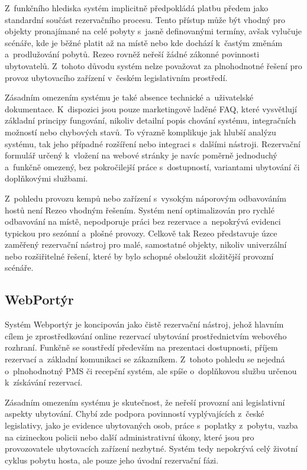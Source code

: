 Z~funkčního hlediska systém implicitně předpokládá platbu předem jako standardní součást rezervačního procesu.
Tento přístup může být vhodný pro objekty pronajímané na celé pobyty s~jasně definovanými termíny, avšak vylučuje scénáře, kde je běžné platit až na místě nebo kde dochází k~častým změnám a~prodlužování pobytů.
Rezeo rovněž neřeší žádné zákonné povinnosti ubytovatelů.
Z~tohoto důvodu systém nelze považovat za plnohodnotné řešení pro provoz ubytovacího zařízení v~českém legislativním prostředí.

Zásadním omezením systému je také absence technické a~uživatelské dokumentace.
K~dispozici jsou pouze marketingově laděné FAQ, které vysvětlují základní principy fungování, nikoliv detailní popis chování systému, integračních možností nebo chybových stavů.
To výrazně komplikuje jak hlubší analýzu systému, tak jeho případné rozšíření nebo integraci s~dalšími nástroji.
Rezervační formulář určený k~vložení na webové stránky je navíc poměrně jednoduchý a~funkčně omezený, bez pokročilejší práce s~dostupností, variantami ubytování či doplňkovými službami.

Z~pohledu provozu kempů nebo zařízení s~vysokým náporovým odbavováním hostů není Rezeo vhodným řešením.
Systém není optimalizován pro rychlé odbavování na místě, nepodporuje práci bez rezervace a~nepokrývá evidenci typickou pro sezónní a~plošné provozy.
Celkově tak Rezeo představuje úzce zaměřený rezervační nástroj pro malé, samostatné objekty, nikoliv univerzální nebo rozšiřitelné řešení, které by bylo schopné obsloužit složitější provozní scénáře.

\subsection{WebPortýr}
Systém Webportýr je koncipován jako čistě rezervační nástroj, jehož hlavním cílem je zprostředkování online rezervací ubytování prostřednictvím webového rozhraní.
Funkčně se soustředí především na prezentaci dostupnosti, příjem rezervací a~základní komunikaci se zákazníkem.
Z~tohoto pohledu se nejedná o~plnohodnotný PMS či recepční systém, ale spíše o~doplňkovou službu určenou k~získávání rezervací.

Zásadním omezením systému je skutečnost, že neřeší provozní ani legislativní aspekty ubytování.
Chybí zde podpora povinností vyplývajících z~české legislativy, jako je evidence ubytovaných osob, práce s~poplatky z~pobytu, vazba na cizineckou policii nebo další administrativní úkony, které jsou pro provozovatele ubytovacích zařízení nezbytné.
Systém tedy nepokrývá celý životní cyklus pobytu hosta, ale pouze jeho úvodní rezervační fázi.

